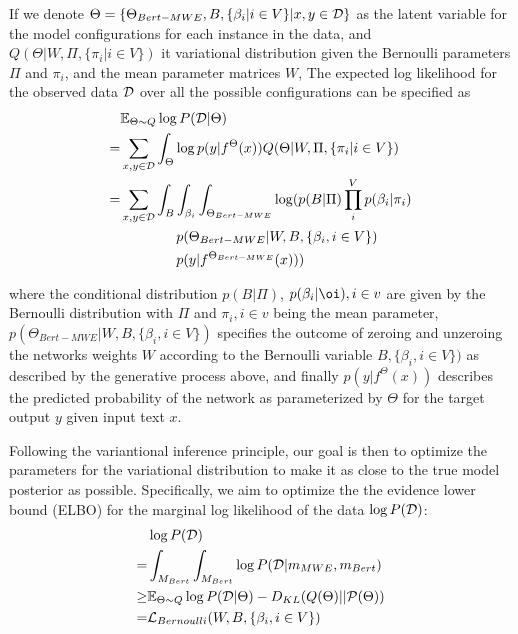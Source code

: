 If we denote $\Theta = \{\Theta_{Bert-MWE}, B, \{\beta_i | i \in V\} \vert x,y \in \mathcal{D} \}$ as the latent variable for the model configurations for each instance in the data, and $Q(\Theta | W, \Pi, \{\pi_i | i \in V\})$ it variational distribution given  
the Bernoulli parameters $\Pi$ and $\pi_i$, and the mean parameter matrices $W$,
The expected log likelihood for the observed data $\mathcal{D}$ over all the possible configurations can be specified as 
\begin{align}
& \mathbb{E}_{\Theta \sim Q} \log P (\mathcalD | \Theta) \nonumber\\ 
= & \sum_{x, y \in \mathcalD} \int_{\Theta} \log p(y \vert f^{\Theta}(x)) Q(\Theta | W, \Pi, \{\pi_i | i \in V\}) \nonumber\\ 
= & \sum_{x, y \in \mathcalD} \int_B \int_{\beta_i}\int_{\Theta_{Bert-MWE}} \log ( p(B | \Pi) \prod_i^{V} p(\beta_i | \pi_i) \nonumber\\ 
& \quad \quad \quad \quad p(\Theta_{Bert-MWE} \vert W, B, \{\beta_i, i \in V\}) \nonumber\\ 
& \quad \quad \quad \quad p(y \vert f^{\Theta_{Bert-MWE}}(x)) )
\label{eq:exp}
\end{align}

where the conditional distribution 
$p(B | \Pi)$, $p(\beta_i | \oi), i\in v$ are given by the Bernoulli distribution with $\Pi$ and $\pi_i, i\in v$ being the mean parameter, 
$p(\Theta_{Bert-MWE} \vert W, B, \{\beta_i, i \in V\})$ specifies the outcome of zeroing and unzeroing the networks weights $W$ according to the Bernoulli variable $B, \{\beta_i, i \in V\})$ as described by the generative process above,
and finally $p(y \vert f^{\Theta}(x))$ describes the predicted probability of the network as parameterized by $\Theta$ for the target output $y$ given input text $x$. 




Following the variantional inference principle, our goal is then to optimize the parameters for the variational distribution to make it as close to the true model posterior as possible. Specifically, we aim to optimize the the evidence lower bound (ELBO) for the marginal log likelihood of the data $\log P( \mathcal{D} )$: 
\begin{align}
    &\log P( \mathcalD ) \nonumber\\
    = & \int_{M_{Bert}} \int_{M_{Bert}} \log P( \mathcalD | m_{MWE}, m_{Bert} ) \nonumber\\
    \geq& \mathbb{E}_{\Theta \sim Q} \log P (\mathcalD | \Theta) - D_{KL}(Q( \Theta) ||\mathcal{P}( \Theta)) \nonumber\\
    = & \mathcal{L}_{Bernoulli} (W, B, \{\beta_i, i \in V\}) \label{eq:elbo0}
\end{align}

